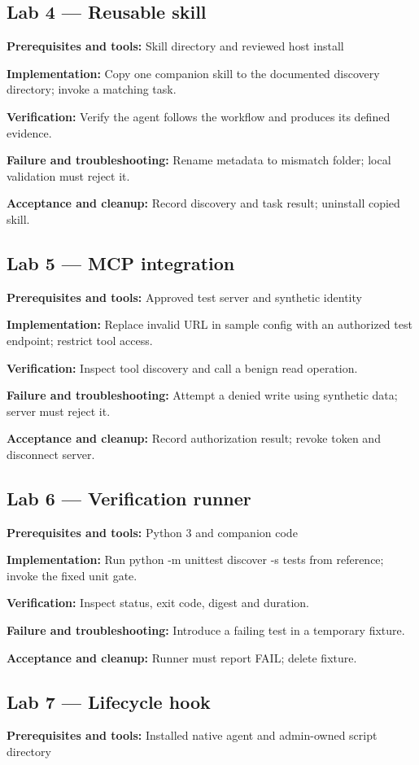 \documentclass[11pt,letterpaper]{article}
\begin{document}
\subsection*{Lab 4 --- Reusable skill}
\textbf{Prerequisites and tools:} Skill directory and reviewed host install

\textbf{Implementation:} Copy one companion skill to the documented discovery directory; invoke a matching task.

\textbf{Verification:} Verify the agent follows the workflow and produces its defined evidence.

\textbf{Failure and troubleshooting:} Rename metadata to mismatch folder; local validation must reject it.

\textbf{Acceptance and cleanup:} Record discovery and task result; uninstall copied skill.

\subsection*{Lab 5 --- MCP integration}
\textbf{Prerequisites and tools:} Approved test server and synthetic identity

\textbf{Implementation:} Replace invalid URL in sample config with an authorized test endpoint; restrict tool access.

\textbf{Verification:} Inspect tool discovery and call a benign read operation.

\textbf{Failure and troubleshooting:} Attempt a denied write using synthetic data; server must reject it.

\textbf{Acceptance and cleanup:} Record authorization result; revoke token and disconnect server.

\subsection*{Lab 6 --- Verification runner}
\textbf{Prerequisites and tools:} Python 3 and companion code

\textbf{Implementation:} Run python -m unittest discover -s tests from reference; invoke the fixed unit gate.

\textbf{Verification:} Inspect status, exit code, digest and duration.

\textbf{Failure and troubleshooting:} Introduce a failing test in a temporary fixture.

\textbf{Acceptance and cleanup:} Runner must report FAIL; delete fixture.

\subsection*{Lab 7 --- Lifecycle hook}
\textbf{Prerequisites and tools:} Installed native agent and admin-owned script directory
\end{document}
